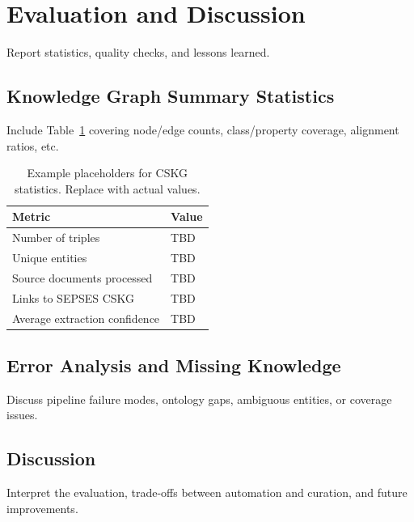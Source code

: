 \section{Evaluation and Discussion}
Report statistics, quality checks, and lessons learned.

\subsection{Knowledge Graph Summary Statistics}
Include Table~\ref{tab:kgstats} covering node/edge counts, class/property coverage, alignment ratios, etc.

\begin{table}
  \caption{Example placeholders for CSKG statistics. Replace with actual values.}
  \label{tab:kgstats}
  \centering
  \begin{tabular}{@{}ll@{}}
    \toprule
    Metric & Value \\
    \midrule
    Number of triples & TBD \\
    Unique entities & TBD \\
    Source documents processed & TBD \\
    Links to SEPSES CSKG & TBD \\
    Average extraction confidence & TBD \\
    \bottomrule
  \end{tabular}
\end{table}

\subsection{Error Analysis and Missing Knowledge}
Discuss pipeline failure modes, ontology gaps, ambiguous entities, or coverage issues.

\subsection{Discussion}
Interpret the evaluation, trade-offs between automation and curation, and future improvements.
